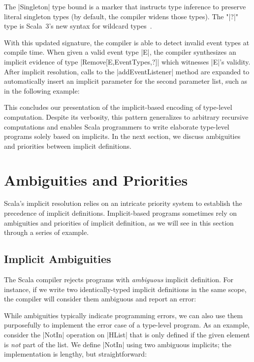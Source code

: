 \addEventListenerImplicitDef

\noindent
The |Singleton| type bound is a marker that instructs type inference to preserve literal singleton types (by default, the compiler widens those types).
The "|?|" type is Scala~3's new syntax for wildcard types~\citep[Wildcard Arguments in Types]{odersky2013scala}.

With this updated signature, the compiler is able to detect invalid event types at compile time.
When given a valid event type |E|, the compiler synthesizes an implicit evidence of type |Remove[E,EventTypes,?]| which witnesses |E|'s validity.
After implicit resolution, calls to the |addEventListener| method are expanded to automatically insert an implicit parameter for the second parameter list, such as in the following example:

\addEventListenerImplicitCall

This concludes our presentation of the implicit-based encoding of type-level computation.
Despite its verbosity, this pattern generalizes to arbitrary recursive computations and enables Scala programmers to write elaborate type-level programs solely based on implicits.
In the next section, we discuss ambiguities and priorities between implicit definitions.

\section{Ambiguities and Priorities}

Scala's implicit resolution relies on an intricate priority system to establish the precedence of implicit definitions.
Implicit-based programs sometimes rely on ambiguities and priorities of implicit definition, as we will see in this section through a series of example.

\subsection{Implicit Ambiguities}

The Scala compiler rejects programs with \emph{ambiguous} implicit definition.
For instance, if we write two identically-typed implicit definitions in the same scope, the compiler will consider them ambiguous and report an error:

\implicitAmbiguity

While ambiguities typically indicate programming errors, we can also use them purposefully to implement the error case of a type-level program.
As an example, consider the |NotIn| operation on |HList| that is only defined if the given element is \emph{not} part of the list.
We define |NotIn| using two ambiguous implicits; the implementation is lengthy, but straightforward:

